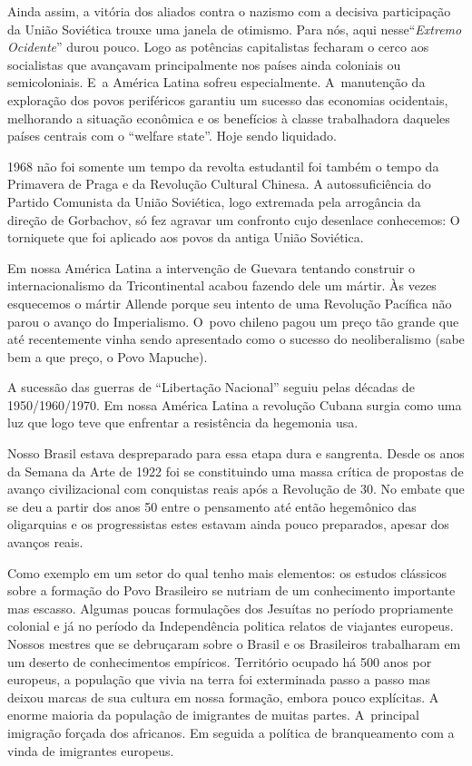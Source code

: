 Ainda assim, a vitória dos aliados contra o nazismo com a decisiva
participação da União Soviética trouxe uma janela de otimismo. Para nós,
aqui nesse“{\it Extremo Ocidente}” durou pouco. Logo as potências
capitalistas fecharam o cerco aos socialistas que avançavam
principalmente nos países ainda coloniais ou semicoloniais. E~a América
Latina sofreu especialmente. A~manutenção da exploração dos povos
periféricos garantiu um sucesso das economias ocidentais, melhorando a
situação econômica e os benefícios à classe trabalhadora daqueles países
centrais com o “welfare state”. Hoje sendo liquidado.

1968 não foi somente um tempo da revolta estudantil foi também o tempo
da Primavera de Praga e da Revolução Cultural Chinesa. A
autossuficiência do Partido Comunista da União Soviética, logo extremada
pela arrogância da direção de Gorbachov, só fez agravar um confronto
cujo desenlace conhecemos: O torniquete que foi aplicado aos povos da
antiga União Soviética.

Em nossa América Latina a intervenção de Guevara tentando construir o
internacionalismo da Tricontinental acabou fazendo dele um mártir. Às
vezes esquecemos o mártir Allende porque seu intento de uma Revolução
Pacífica não parou o avanço do Imperialismo. O~povo chileno pagou um
preço tão grande que até recentemente vinha sendo apresentado como o
sucesso do neoliberalismo (sabe bem a que preço, o Povo Mapuche).

A sucessão das guerras de “Libertação Nacional” seguiu pelas décadas de
1950/1960/1970. Em nossa América Latina a revolução Cubana surgia como
uma luz que logo teve que enfrentar a resistência da hegemonia {\sc usa}.

Nosso Brasil estava despreparado para essa etapa dura e sangrenta. Desde
os anos da Semana da Arte de 1922 foi se constituindo uma massa crítica
de propostas de avanço civilizacional com conquistas reais após a
Revolução de 30. No embate que se deu a partir dos anos 50 entre o
pensamento até então hegemônico das oligarquias e os progressistas estes
estavam ainda pouco preparados, apesar dos avanços reais.

Como exemplo em um setor do qual tenho mais elementos: os estudos
clássicos sobre a formação do Povo Brasileiro se nutriam de um
conhecimento importante mas escasso. Algumas poucas formulações dos
Jesuítas no período propriamente colonial e já no período da
Independência politica relatos de viajantes europeus. Nossos mestres que
se debruçaram sobre o Brasil e os Brasileiros trabalharam em um deserto
de conhecimentos empíricos. Território ocupado há 500 anos por europeus,
a população que vivia na terra foi exterminada passo a passo mas deixou
marcas de sua cultura em nossa formação, embora pouco explícitas. A
enorme maioria da população de imigrantes de muitas partes. A~principal
imigração forçada dos africanos. Em seguida a política de branqueamento
com a vinda de imigrantes europeus.


